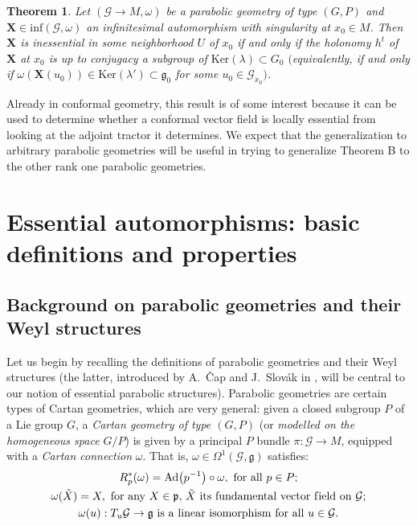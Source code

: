 \documentclass[pdftex]{sigma}
\def\g{\mathfrak{g}}
\def\p{\mathfrak{p}}
\def\Gbdle{\mathcal{G}}
\theoremstyle{plain}
\newtheorem{Theorem}{Theorem}[section]
\theoremstyle{definition}
\begin{document}
\begin{Theorem} \label{local essential dictionary} Let $(\Gbdle \rightarrow M,\omega)$ be a parabolic geometry of type $(G,P)$ and $\mathbf{X} \in \mathrm{inf}(\Gbdle,\omega)$ an infinitesimal automorphism with singularity at $x_0 \in M$. Then $\mathbf{X}$ is inessential in some neighborhood $U$ of $x_0$ if and only if the holonomy $h^t$ of $\mathbf{X}$ at $x_0$ is up to conjugacy a subgroup of $\mathrm{Ker}(\lambda) \subset G_0$ $($equivalently, if and only if $\omega(\mathbf{X}(u_0)) \in \mathrm{Ker}(\lambda') \subset \g_0$ for some $u_0 \in \Gbdle_{x_0})$.
\end{Theorem}

Already in conformal geometry, this result is of some interest because it can be used to determine whether a conformal vector f\/ield is locally essential from looking at the adjoint tractor it determines. We expect that the generalization to arbitrary parabolic geometries will be useful in trying to generalize Theorem B to the other rank one parabolic geometries.

\section{Essential automorphisms: basic def\/initions and properties}\label{section2}

\subsection{Background on parabolic geometries and their Weyl structures}\label{section2.1}

Let us begin by recalling the def\/initions of parabolic geometries and their Weyl structures (the latter, introduced by A.~\v{C}ap and J.~Slov\'ak in \cite{CS03}, will be central to our notion of essential parabolic structures). Parabolic geometries are certain types of Cartan geometries, which are very general: given a closed subgroup $P$ of a Lie group $G$, a \textit{Cartan geometry of type $(G,P)$} (or \textit{modelled on the homogeneous space $G/P$}) is given by a principal $P$ bundle $\pi: \Gbdle \rightarrow M$, equipped with a \textit{Cartan connection} $\omega$. That is, $\omega \in \Omega^1(\Gbdle,\g)$ satisf\/ies:
\begin{gather}
R_p^*(\omega) = \mathrm{Ad}\big(p^{-1}\big) \circ \omega, \,\, \mathrm{for} \,\, \mathrm{all} \,\, p \in P; \label{ad-inv}\\
\omega(\tilde{X}) = X, \,\, \mathrm{for} \,\, \mathrm{any} \,\, X \in \p, \, \tilde{X} \,\, \mathrm{its} \,\, \mathrm{fundamental} \,\, \mathrm{vector} \,\, \mathrm{f\/ield} \,\, \mathrm{on} \,\, \Gbdle; \label{fund-vfs}\\
\omega(u) : T_u\Gbdle \rightarrow \g \,\, \mathrm{is} \,\, \mathrm{a} \,\, \mathrm{linear} \,\, \mathrm{isomorphism} \,\, \mathrm{for} \,\, \mathrm{all} \,\,u \in \Gbdle. \label{parallelism}
\end{gather}
\end{document}
